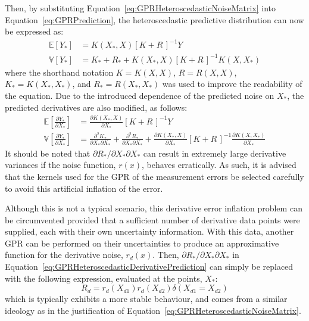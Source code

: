 \documentclass{article}
\begin{document}
Then, by substituting Equation~\eqref{eq:GPRHeteroscedasticNoiseMatrix} into Equation~\eqref{eq:GPRPrediction}, the heteroscedastic predictive distribution can now be expressed as:
\begin{equation}
\label{eq:GPRHeteroscedasticPrediction}
	\begin{aligned}
	\mathbb{E}\!\left[Y_*\right] &= K\!\left(X_*,X\right) \left[K + R\,\right]^{-1} Y \\
	\mathbb{V}\!\left[Y_*\right] &= K_* + R_* + K\!\left(X_*,X\right) \left[K + R\,\right]^{-1} K\!\left(X,X_*\right)
	\end{aligned}
\end{equation}
where the shorthand notation $K = K\!\left(X,X\right)$, $R = R\!\left(X,X\right)$, $K_* = K\!\left(X_*,X_*\right)$, and $R_* = R\!\left(X_*,X_*\right)$ was used to improve the readability of the equation. Due to the introduced dependence of the predicted noise on $X_*$, the predicted derivatives are also modified, as follows:
\begin{equation}
\label{eq:GPRHeteroscedasticDerivativePrediction}
	\begin{aligned}
	\mathbb{E}\!\left[\frac{\partial Y_*}{\partial X_*}\right] &= \frac{\partial K\!\left(X_*,X\right)}{\partial X_*} \left[K + R\,\right]^{-1} Y \\
	\mathbb{V}\!\left[\frac{\partial Y_*}{\partial X_*}\right] &= \frac{\partial^2 K_*}{\partial X_* \partial X_*} + \frac{\partial^2 R_*}{\partial X_* \partial X_*} + \frac{\partial K\!\left(X_*,X\right)}{\partial X_*} \left[K + R\,\right]^{-1} \frac{\partial K\!\left(X,X_*\right)}{\partial X_*}
	\end{aligned}
\end{equation}
It should be noted that $\partial R_* / \partial X_* \partial X_*$ can result in extremely large derivative variances if the noise function, $r\!\left(x\right)$, behaves erratically. As such, it is advised that the kernels used for the GPR of the measurement errors be selected carefully to avoid this artificial inflation of the error.

Although this is not a typical scenario, this derivative error inflation problem can be circumvented provided that a sufficient number of derivative data points were supplied, each with their own uncertainty information. With this data, another GPR can be performed on their uncertainties to produce an approximative function for the derivative noise, $r_d\!\left(x\right)$. Then, $\partial R_* / \partial X_* \partial X_*$ in Equation~\eqref{eq:GPRHeteroscedasticDerivativePrediction} can simply be replaced with the following expression, evaluated at the points, $X_*$:
\begin{equation}
\label{eq:GPRHeteroscedasticDerivativeNoiseMatrix}
	R_d = r_d\!\left(X_{d1}\right) r_d\!\left(X_{d2}\right) \delta\!\left(X_{d1} = X_{d2}\right)
\end{equation}
which is typically exhibits a more stable behaviour, and comes from a similar ideology as in the justification of Equation~\eqref{eq:GPRHeteroscedasticNoiseMatrix}.
\end{document}
